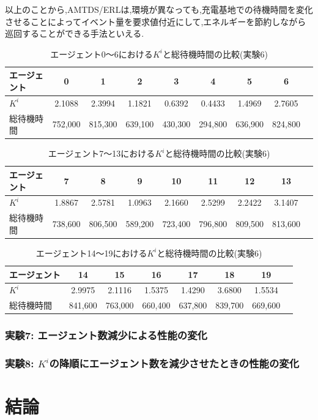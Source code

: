 \documentclass[12pt,a4j,twoside]{jarticle}
\begin{document}
  \par
  以上のことから,AMTDS/ERLは,環境が異なっても,充電基地での待機時間を変化させることによってイベント量を要求値付近にして,エネルギーを節約しながら巡回することができる手法といえる.

  \begin{table}
    \centering
    \caption{エージェント0～6における$K^i$と総待機時間の比較(実験6)}
    \begin{tabular}{lcccccccr}\\ \hline
      エージェント & 0 & 1 & 2 & 3 & 4 & 5 & 6 \\ \hline
      $K^i$ & 2.1088 & 2.3994 & 1.1821 & 0.6392 & 0.4433 & 1.4969 & 2.7605 \\ \hline
      総待機時間 & 752,000 & 815,300 & 639,100 & 430,300 & 294,800 & 636,900 & 824,800 \\ \hline
    \end{tabular}
    \label{tb:ERL_Complex_k1}
  \end{table}

  \begin{table}
    \centering
    \caption{エージェント7～13における$K^i$と総待機時間の比較(実験6)}
    \begin{tabular}{lcccccccr}\\ \hline
      エージェント & 7 & 8 & 9 & 10 & 11 & 12 & 13 \\ \hline
      $K^i$  & 1.8867 & 2.5781 & 1.0963 & 2.1660 & 2.5299 & 2.2422 & 3.1407 \\ \hline
      総待機時間 & 738,600 & 806,500 & 589,200 & 723,400 & 796,800 & 809,500 & 813,600 \\ \hline 
    \end{tabular}
    \label{tb:ERL_Complex_k2}
  \end{table}

  \begin{table}
    \centering
    \caption{エージェント14～19における$K^i$と総待機時間の比較(実験6)}
    \begin{tabular}{lccccccr}\\ \hline
      エージェント & 14 & 15 & 16 & 17 & 18 & 19 \\ \hline
      $K^i$  & 2.9975 & 2.1116 & 1.5375 &1.4290 & 3.6800 & 1.5534 \\ \hline
      総待機時間 & 841,600 & 763,000 & 660,400 & 637,800 & 839,700 & 669,600 \\ \hline
    \end{tabular}
    \label{tb:ERL_Complex_k3}
  \end{table}

  \subsubsection{実験7: エージェント数減少による性能の変化}

  \subsubsection{実験8: $K^i$の降順にエージェント数を減少させたときの性能の変化}

  \section{結論}

  \clearpage
  
  
\end{document}
